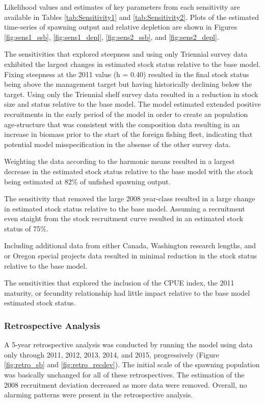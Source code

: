 \documentclass[12pt,]{article}
\begin{document}
Likelihood values and estimates of key parameters from each sensitivity
are available in Tables \ref{tab:Sensitivity1} and
\ref{tab:Sensitivity2}. Plots of the estimated time-series of spawning
output and relative depletion are shown in Figures \ref{fig:sens1_ssb},
\ref{fig:sens1_depl}, \ref{fig:sens2_ssb}, and \ref{fig:sens2_depl}.

The sensitivities that explored steepness and using only Triennial
survey data exhibited the largest changes in estimated stock status
relative to the base model. Fixing steepness at the 2011 value (h =
0.40) resulted in the final stock status being above the management
target but having historically declining below the target. Using only
the Triennial shelf survey data resulted in a reduction in stock size
and status relative to the base model. The model estimated extended
positive recruitments in the early period of the model in order to
create an population age-structure that was consistent with the
composition data resulting in an increase in biomass prior to the start
of the foreign fishing fleet, indicating that potential model
misspecification in the absense of the other survey data.

Weighting the data according to the harmonic means resulted in a largest
decrease in the estimated stock status relative to the base model with
the stock being estimated at 82\% of unfished spawning output.

The sensitivity that removed the large 2008 year-class resulted in a
large change in estimated stock status relative to the base model.
Assuming a recruitment even staight from the stock recruitment curve
resulted in an estimated stock status of 75\%.

Including additional data from either Canada, Washington research
lengths, and or Oregon special projects data resulted in minimal
reduction in the stock status relative to the base model.

The sensitivities that explored the inclusion of the CPUE index, the
2011 maturity, or fecundity relationship had little impact relative to
the base model estimated stock status.

\subsubsection{Retrospective Analysis}\label{retrospective-analysis}

A 5-year retrospective analysis was conducted by running the model using
data only through 2011, 2012, 2013, 2014, and 2015, progressively
(Figure \ref{fig:retro_sb} and \ref{fig:retro_recdev}). The initial
scale of the spawning population was basically unchanged for all of
these retrospectives. The estimation of the 2008 recruitment deviation
decreased as more data were removed. Overall, no alarming patterns were
present in the retrospective analysis.
\end{document}
